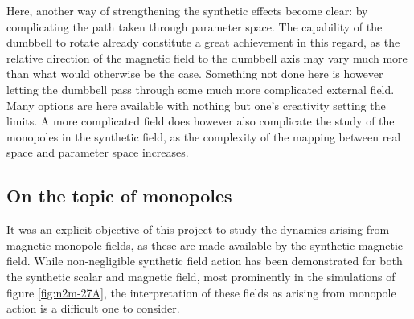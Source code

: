 \documentclass[main.tex]{subfiles}
\begin{document}
Here, another way of strengthening the synthetic effects become clear: by complicating the
path taken through parameter space. The capability of the dumbbell to rotate already
constitute a great achievement in this regard, as the relative direction of the magnetic
field to the dumbbell axis may vary much more than what would otherwise be the case.
Something not done here is however letting the dumbbell pass through some much more
complicated external field. Many options are here available with nothing but one's
creativity setting the limits. A more complicated field does however also complicate the
study of the monopoles in the synthetic field, as the complexity of the mapping between
real space and parameter space increases.

\subsection{On the topic of monopoles}
It was an explicit objective of this project to study the dynamics arising from magnetic monopole
fields, as these are made available by the synthetic magnetic field. While non-negligible
synthetic field action has been demonstrated for both the synthetic scalar and magnetic
field, most prominently in the simulations of figure \ref{fig:n2m-27A}, the interpretation
of these fields as arising from monopole action is a difficult one to consider. 
\end{document}
